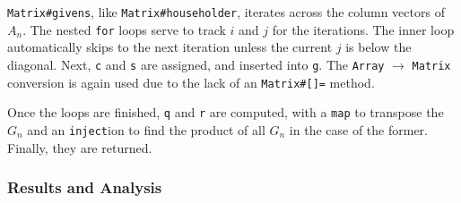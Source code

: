 \documentclass[letterpaper,12pt]{article}
\begin{document}
\texttt{Matrix\#givens}, like \texttt{Matrix\#householder}, iterates across the
column vectors of $A_n$.
The nested \texttt{for} loops serve to track $i$ and $j$ for the iterations.
The inner loop automatically skips to the next iteration unless the current
$j$ is below the diagonal.
Next, \texttt{c} and \texttt{s} are assigned, and inserted into \texttt{g}.
The \texttt{Array} $\to$ \texttt{Matrix} conversion is again used due to the lack of
an \texttt{Matrix\#[]=} method.

Once the loops are finished, \texttt{q} and \texttt{r} are computed, with a
\texttt{map} to transpose the $G_n$ and an \texttt{inject}ion to find the product
of all $G_n$ in the case of the former.
Finally, they are returned.
\\
\subsubsection{Results and Analysis}
\end{document}
